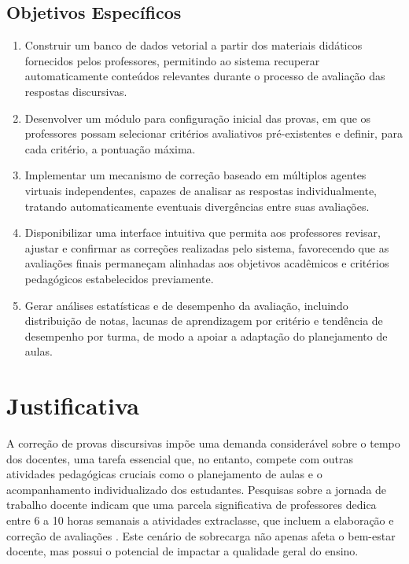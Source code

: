 \subsection{Objetivos Específicos}
\begin{enumerate}
\item Construir um banco de dados vetorial a partir dos materiais didáticos fornecidos pelos professores, permitindo ao sistema recuperar automaticamente conteúdos relevantes durante o processo de avaliação das respostas discursivas. 

\item Desenvolver um módulo para configuração inicial das provas, em que os professores possam selecionar critérios avaliativos pré-existentes e definir, para cada critério, a pontuação máxima.

\item Implementar um mecanismo de correção baseado em múltiplos agentes virtuais independentes, capazes de analisar as respostas individualmente, tratando automaticamente eventuais divergências entre suas avaliações.

\item Disponibilizar uma interface intuitiva que permita aos professores revisar, ajustar e confirmar as correções realizadas pelo sistema, favorecendo que as avaliações finais permaneçam alinhadas aos objetivos acadêmicos e critérios pedagógicos estabelecidos previamente.

\item Gerar análises estatísticas e de desempenho da avaliação, incluindo distribuição de notas, lacunas de aprendizagem por critério e tendência de desempenho por turma, de modo a apoiar a adaptação do planejamento de aulas.

\end{enumerate}

\section{Justificativa}

A correção de provas discursivas impõe uma demanda considerável sobre o tempo dos docentes, uma tarefa essencial que, no entanto, compete com outras atividades pedagógicas cruciais como o planejamento de aulas e o acompanhamento individualizado dos estudantes. Pesquisas sobre a jornada de trabalho docente indicam que uma parcela significativa de professores dedica entre 6 a 10 horas semanais a atividades extraclasse, que incluem a elaboração e correção de avaliações \cite{barbosa_tempo_2021}. Este cenário de sobrecarga não apenas afeta o bem-estar docente, mas possui o potencial de impactar a qualidade geral do ensino.

